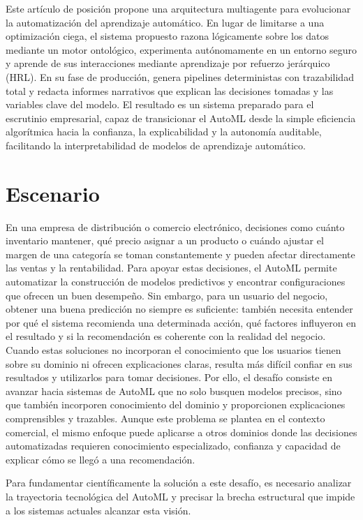 \documentclass[conference]{IEEEtran}
\begin{document}
Este artículo de posición propone una arquitectura multiagente para evolucionar la automatización del aprendizaje automático. En lugar de limitarse a una optimización ciega, el sistema propuesto razona lógicamente sobre los datos mediante un motor ontológico, experimenta autónomamente en un entorno seguro y aprende de sus interacciones mediante aprendizaje por refuerzo jerárquico (HRL). En su fase de producción, genera pipelines deterministas con trazabilidad total y redacta informes narrativos que explican las decisiones tomadas y las variables clave del modelo. El resultado es un sistema preparado para el escrutinio empresarial, capaz de transicionar el AutoML desde la simple eficiencia algorítmica hacia la confianza, la explicabilidad y la autonomía auditable, facilitando la interpretabilidad de modelos de aprendizaje automático.

\section{Escenario}
En una empresa de distribución o comercio electrónico, decisiones como cuánto inventario mantener, qué precio asignar a un producto o cuándo ajustar el margen de una categoría se toman constantemente y pueden afectar directamente las ventas y la rentabilidad. Para apoyar estas decisiones, el AutoML permite automatizar la construcción de modelos predictivos y encontrar configuraciones que ofrecen un buen desempeño. Sin embargo, para un usuario del negocio, obtener una buena predicción no siempre es suficiente: también necesita entender por qué el sistema recomienda una determinada acción, qué factores influyeron en el resultado y si la recomendación es coherente con la realidad del negocio. Cuando estas soluciones no incorporan el conocimiento que los usuarios tienen sobre su dominio ni ofrecen explicaciones claras, resulta más difícil confiar en sus resultados y utilizarlos para tomar decisiones. Por ello, el desafío consiste en avanzar hacia sistemas de AutoML que no solo busquen modelos precisos, sino que también incorporen conocimiento del dominio y proporcionen explicaciones comprensibles y trazables. Aunque este problema se plantea en el contexto comercial, el mismo enfoque puede aplicarse a otros dominios donde las decisiones automatizadas requieren conocimiento especializado, confianza y capacidad de explicar cómo se llegó a una recomendación.

Para fundamentar científicamente la solución a este desafío, es necesario analizar la trayectoria tecnológica del AutoML y precisar la brecha estructural que impide a los sistemas actuales alcanzar esta visión.
\end{document}
